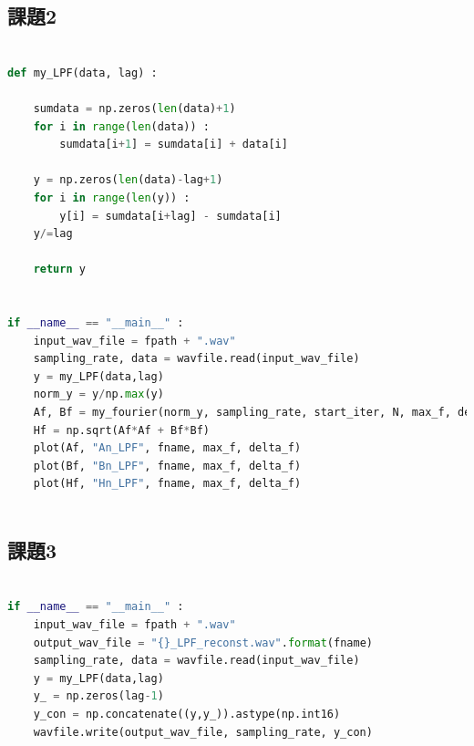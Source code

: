 \documentclass[a4j,11pt]{jarticle}
\begin{document}
    \subsection{課題2}
    \begin{lstlisting}[language = Python, caption = LPF.py]

def my_LPF(data, lag) :

    sumdata = np.zeros(len(data)+1)
    for i in range(len(data)) :
        sumdata[i+1] = sumdata[i] + data[i]
    
    y = np.zeros(len(data)-lag+1)
    for i in range(len(y)) :
        y[i] = sumdata[i+lag] - sumdata[i]
    y/=lag

    return y


if __name__ == "__main__" :
    input_wav_file = fpath + ".wav"
    sampling_rate, data = wavfile.read(input_wav_file)
    y = my_LPF(data,lag)
    norm_y = y/np.max(y)
    Af, Bf = my_fourier(norm_y, sampling_rate, start_iter, N, max_f, delta_f)
    Hf = np.sqrt(Af*Af + Bf*Bf)
    plot(Af, "An_LPF", fname, max_f, delta_f)
    plot(Bf, "Bn_LPF", fname, max_f, delta_f)
    plot(Hf, "Hn_LPF", fname, max_f, delta_f)
        
    \end{lstlisting}
    \subsection{課題3}
    \begin{lstlisting}[language = Python , caption = LPF\_reconst.py]

if __name__ == "__main__" :
    input_wav_file = fpath + ".wav"
    output_wav_file = "{}_LPF_reconst.wav".format(fname)
    sampling_rate, data = wavfile.read(input_wav_file)
    y = my_LPF(data,lag)
    y_ = np.zeros(lag-1)
    y_con = np.concatenate((y,y_)).astype(np.int16)
    wavfile.write(output_wav_file, sampling_rate, y_con)

    \end{lstlisting}
    
\end{document}
